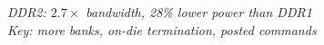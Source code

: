 \documentclass[aspectratio=169]{beamer}
\begin{document}
{\begin{frame}[plain]
  \vspace{0.5cm}
  \begin{center}
    {\color{ddrlite}\footnotesize\itshape
      DDR2: $2.7\times$ bandwidth, 28\% lower power than DDR1\\
      Key: more banks, on-die termination, posted commands}
  \end{center}
\end{frame}
}
\end{document}
